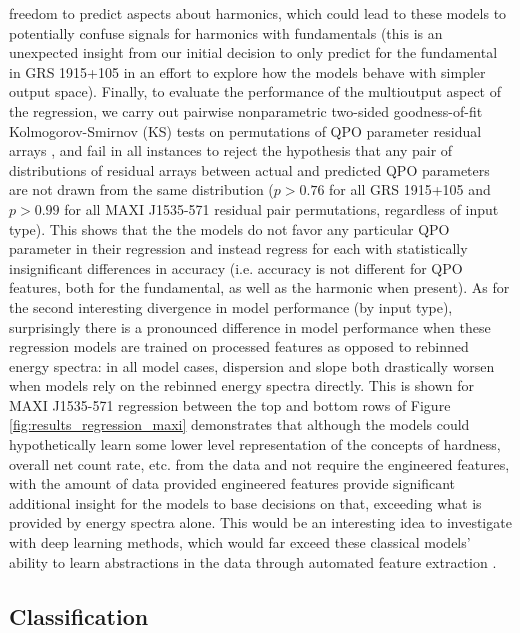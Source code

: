 \documentclass[fleqn,usenatbib,twocolumn]{mnras}%
\begin{document}
freedom to predict aspects about harmonics, which could lead to these models to potentially confuse signals for harmonics with fundamentals (this is an unexpected insight from our initial decision to only predict for the fundamental in GRS 1915+105 in an effort to explore how the models behave with simpler output space). Finally, to evaluate the performance of the multioutput aspect of the regression, we carry out pairwise nonparametric  two-sided goodness-of-fit Kolmogorov-Smirnov (KS) tests on permutations of QPO parameter residual arrays \citep{KS-test,KS-test-review}, and fail in all instances to reject the hypothesis that any pair of distributions of residual arrays between actual and predicted QPO parameters are not drawn from the same distribution ($p>0.76$ for all GRS 1915+105 and $p>0.99$ for all MAXI J1535-571 residual pair permutations, regardless of input type). This shows that the the models do not favor any particular QPO parameter in their regression and instead regress for each with statistically insignificant differences in accuracy (i.e. accuracy is not different for QPO features, both for the fundamental, as well as the harmonic when present). As for the second interesting divergence in model performance (by input type), surprisingly there is a pronounced difference in model performance when these regression models are trained on processed features as opposed to rebinned energy spectra: in all model cases, dispersion and slope both drastically worsen when models rely on the rebinned energy spectra directly. This is shown for MAXI J1535-571 regression between the top and bottom rows of Figure \ref{fig:results_regression_maxi} demonstrates that although the models could hypothetically learn some lower level representation of the concepts of hardness, overall net count rate, etc. from the data and not require the engineered features, with the amount of data provided  engineered features provide significant additional insight for the models to base decisions on that, exceeding what is provided by energy spectra alone. This would be an interesting idea to investigate with deep learning methods, which would far exceed these classical models' ability to learn abstractions in the data through automated feature extraction \citep{nadeauandbengio}. 

\subsection{Classification}
\end{document}
